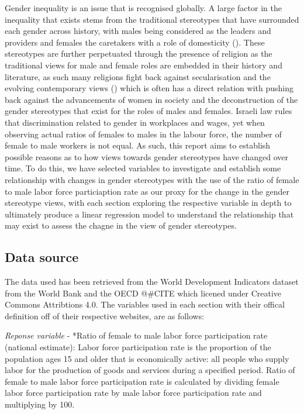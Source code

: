 \documentclass[11pt,a4paper,]{article}
\begin{document}
Gender inequality is an issue that is recognised globally. A large factor in the inequality that exists stems from the traditional stereotypes that have surrounded each gender across history, with males being considered as the leaders and providers and females the caretakers with a role of domesticity (\textcite{Woodhead}). These stereotypes are further perpetuated through the presence of religion as the traditional views for male and female roles are embedded in their history and literature, as such many religions fight back against secularisation and the evolving contemporary views (\textcite{VoicuM2009}) which is often has a direct relation with pushing back against the advancements of women in society and the deconstruction of the gender stereotypes that exist for the roles of males and females. Israeli law rules that discrimination related to gender in workplaces and wages, yet when observing actual ratios of females to males in the labour force, the number of female to male workers is not equal. As such, this report aims to establish possible reasons as to how views towards gender stereotypes have changed over time. To do this, we have selected variables to investigate and establish some relationship with changes in gender stereotypes with the use of the ratio of female to male labor force particiaption rate as our proxy for the change in the gender stereotype views, with each section exploring the respective variable in depth to ultimately produce a linear regression model to understand the relationship that may exist to assess the chagne in the view of gender stereotypes.

\hypertarget{data-source}{%
\subsection{Data source}\label{data-source}}

The data used has been retrieved from the World Development Indicators dataset from the World Bank \textcite{TheWorldBank2018} and the OECD @\#CITE which licened under Creative Commons Attribtions 4.0. The variables used in each section with their offical definition off of their respective websites, are as follows:

\emph{Reponse variable}
- *Ratio of female to male labor force participation rate (national estimate): Labor force participation rate is the proportion of the population ages 15 and older that is economically active: all people who supply labor for the production of goods and services during a specified period. Ratio of female to male labor force participation rate is calculated by dividing female labor force participation rate by male labor force participation rate and multiplying by 100.
\end{document}
